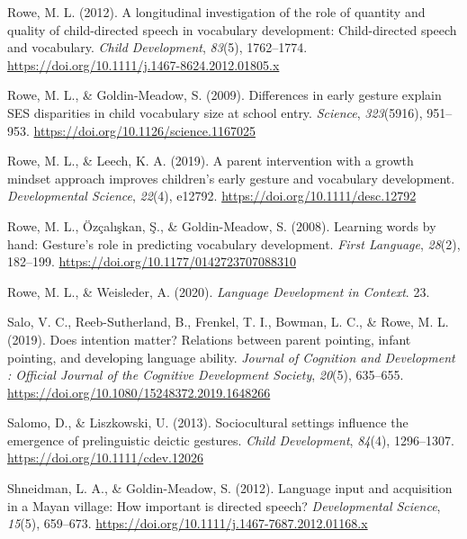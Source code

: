 \documentclass[
  man,floatsintext]{apa6}
\newlength{\cslhangindent}
\newlength{\cslentryspacingunit} %
\newenvironment{CSLReferences}[2] %
 {%
  \setlength{\parindent}{0pt}
  \ifodd #1
  \let\oldpar\par
  \def\par{\hangindent=\cslhangindent\oldpar}
  \fi
  \setlength{\parskip}{#2\cslentryspacingunit}
 }%
 {}
\begin{document}
\begin{CSLReferences}{1}{0}
\leavevmode{}%
Rowe, M. L. (2012). A longitudinal investigation of the role of quantity and quality of child-directed speech in vocabulary development: {Child}-directed speech and vocabulary. \emph{Child Development}, \emph{83}(5), 1762--1774. \url{https://doi.org/10.1111/j.1467-8624.2012.01805.x}

\leavevmode{}%
Rowe, M. L., \& Goldin-Meadow, S. (2009). Differences in early gesture explain {SES} disparities in child vocabulary size at school entry. \emph{Science}, \emph{323}(5916), 951--953. \url{https://doi.org/10.1126/science.1167025}

\leavevmode{}%
Rowe, M. L., \& Leech, K. A. (2019). A parent intervention with a growth mindset approach improves children's early gesture and vocabulary development. \emph{Developmental Science}, \emph{22}(4), e12792. \url{https://doi.org/10.1111/desc.12792}

\leavevmode{}%
Rowe, M. L., Özçalışkan, Ş., \& Goldin-Meadow, S. (2008). Learning words by hand: {Gesture}'s role in predicting vocabulary development. \emph{First Language}, \emph{28}(2), 182--199. \url{https://doi.org/10.1177/0142723707088310}

\leavevmode{}%
Rowe, M. L., \& Weisleder, A. (2020). \emph{Language {Development} in {Context}}. 23.

\leavevmode{}%
Salo, V. C., Reeb-Sutherland, B., Frenkel, T. I., Bowman, L. C., \& Rowe, M. L. (2019). Does intention matter? {Relations} between parent pointing, infant pointing, and developing language ability. \emph{Journal of Cognition and Development : Official Journal of the Cognitive Development Society}, \emph{20}(5), 635--655. \url{https://doi.org/10.1080/15248372.2019.1648266}

\leavevmode{}%
Salomo, D., \& Liszkowski, U. (2013). Sociocultural settings influence the emergence of prelinguistic deictic gestures. \emph{Child Development}, \emph{84}(4), 1296--1307. \url{https://doi.org/10.1111/cdev.12026}

\leavevmode{}%
Shneidman, L. A., \& Goldin-Meadow, S. (2012). Language input and acquisition in a {Mayan} village: {How} important is directed speech? \emph{Developmental Science}, \emph{15}(5), 659--673. \url{https://doi.org/10.1111/j.1467-7687.2012.01168.x}


\end{CSLReferences}
\end{document}
